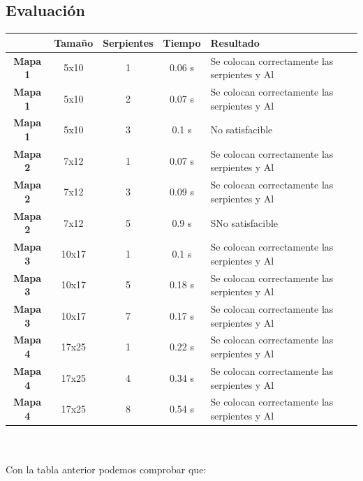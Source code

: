 \documentclass[11pt,spanish]{article}
\begin{document}
		\subsection{Evaluación}
			\begin{tabular}{ |c||c|c|c|l| }
				\hline
				&\textbf{Tamaño}&\textbf{Serpientes}&\textbf{Tiempo}&\textbf{Resultado}\\
				\hline
				\hline
				\textbf{Mapa 1}&5x10&1&0.06 s&Se colocan correctamente las serpientes y Al\\
				\hline
				\textbf{Mapa 1}&5x10&2&0.07 s&Se colocan correctamente las serpientes y Al\\
				\hline
				\textbf{Mapa 1}&5x10&3&0.1 s&No satisfacible\\
				\hline
				\textbf{Mapa 2}&7x12&1&0.07 s&Se colocan correctamente las serpientes y Al\\
				\hline
				\textbf{Mapa 2}&7x12&3&0.09 s&Se colocan correctamente las serpientes y Al\\
				\hline
				\textbf{Mapa 2}&7x12&5&0.9 s&SNo satisfacible\\
				\hline
				\textbf{Mapa 3}&10x17&1&0.1 s&Se colocan correctamente las serpientes y Al\\
				\hline
				\textbf{Mapa 3}&10x17&5&0.18 s&Se colocan correctamente las serpientes y Al\\
				\hline
				\textbf{Mapa 3}&10x17&7&0.17 s&Se colocan correctamente las serpientes y Al\\
				\hline
				\textbf{Mapa 4}&17x25&1&0.22 s&Se colocan correctamente las serpientes y Al\\
				\hline
				\textbf{Mapa 4}&17x25&4&0.34 s&Se colocan correctamente las serpientes y Al\\
				\hline
				\textbf{Mapa 4}&17x25&8&0.54 s&Se colocan correctamente las serpientes y Al\\
				\hline
			\end{tabular}
			\\
			\\
			Con la tabla anterior podemos comprobar que:
\end{document}
